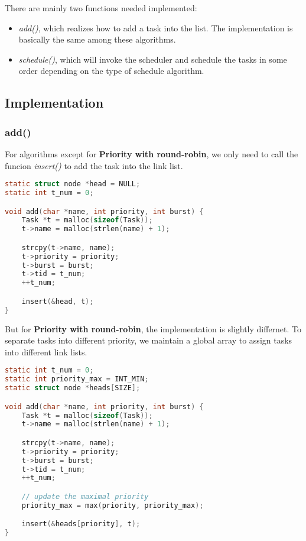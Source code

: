 \documentclass{article}
\begin{document}
There are mainly two functions needed implemented: 
\begin{itemize}
    \item \textit{add()}, which realizes how to add a task into the list. The implementation is basically the same among these algorithms.
    \item \textit{schedule()}, which will invoke the scheduler and schedule the tasks in some order depending on the type of schedule algorithm.
\end{itemize}

\subsection*{Implementation}
\subsubsection*{add()}
For algorithms except for \textbf{Priority with round-robin}, we only need to call the funcion \textit{insert()} to add the task into the link list.

\begin{lstlisting}[language=c,caption={add()}]
static struct node *head = NULL;
static int t_num = 0;

void add(char *name, int priority, int burst) {
    Task *t = malloc(sizeof(Task));
    t->name = malloc(strlen(name) + 1);

    strcpy(t->name, name);
    t->priority = priority;
    t->burst = burst;
    t->tid = t_num;
    ++t_num;

    insert(&head, t);
}
\end{lstlisting}

But for \textbf{Priority with round-robin}, the implementation is slightly differnet. To separate tasks into different priority, we maintain a global array to assign tasks into different link lists. 

\begin{lstlisting}[language=c, caption={add() for priority with round-robin}]
static int t_num = 0;
static int priority_max = INT_MIN;
static struct node *heads[SIZE];

void add(char *name, int priority, int burst) {
    Task *t = malloc(sizeof(Task));
    t->name = malloc(strlen(name) + 1);

    strcpy(t->name, name);
    t->priority = priority;
    t->burst = burst;
    t->tid = t_num;
    ++t_num;

    // update the maximal priority
    priority_max = max(priority, priority_max);

    insert(&heads[priority], t);
}
\end{lstlisting}
\end{document}
